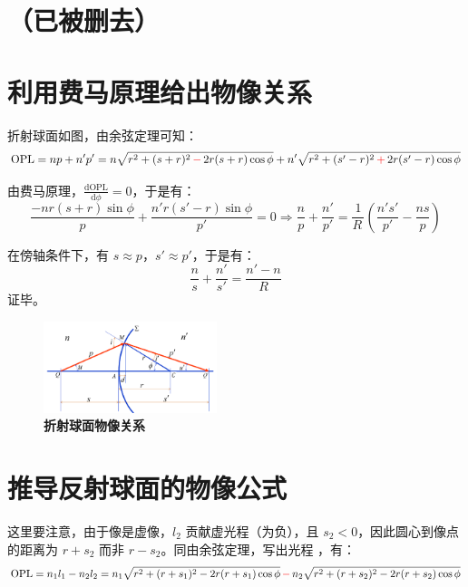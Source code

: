 \documentclass[UTF8]{report}
\theoremstyle{MyLineTheoremStyle} %
\theoremstyle{MyBlockTheoremStyle} %
\theoremstyle{MySubsubsectionStyle} %
\begin{document}
\section{（已被删去）}
\section{利用费马原理给出物像关系}

折射球面如图，由余弦定理可知：
\begin{equation}
\text{OPL} = np + n'p' 
= n \sqrt{r^2 + (s+r)^2 \,{\color{red} -}\, 2r(s+r)\cos \phi } + n' \sqrt{r^2 + (s'-r)^2 \,{\color{red} +}\, 2r(s'-r)\cos \phi } 
\end{equation}

由费马原理，$\frac{\mathrm{d} \text{OPL}  }{\mathrm{d} \phi } = 0$，于是有：
\begin{equation}
\frac{-nr(s+r)\sin \phi }{p} + \frac{n'r(s'-r)\sin \phi }{p'} = 0 \Longrightarrow  \frac{n}{p} + \frac{n'}{p'} = \frac{1}{R\,}\left( \frac{n's'}{p'} - \frac{ns}{p} \right)
\end{equation}

在傍轴条件下，有 $s \approx p$，$s' \approx p'$，于是有：
\begin{equation}
\frac{n}{s} + \frac{n'}{s'} = \frac{n' - n}{R}
\end{equation}
证毕。
\begin{figure}[H]\centering
\includegraphics[width=0.45\textwidth]{assets/7dd67844c3c8000268c32546583de193.png}
\caption{\textbf{折射球面物像关系}}\label{折射球面物像关系}
\end{figure}

\section{推导反射球面的物像公式}

这里要注意，由于像是虚像，$l_2$ 贡献虚光程（为负），且 $s_2<0$，因此圆心到像点的距离为 $r+s_2$ 而非 $r-s_2$。同由余弦定理，写出光程 ，有：
\begin{equation}
\text{OPL} = n_1l_1 - n_2l_2 
=
n_1\sqrt{r^2 + (r+s_1)^2 - 2r(r+s_1)\cos \phi } \,{\color{red} -}\, n_2 \sqrt{r^2 + (r+s_2)^2 - 2r(r+s_2)\cos \phi } 
\end{equation}
\end{document}
